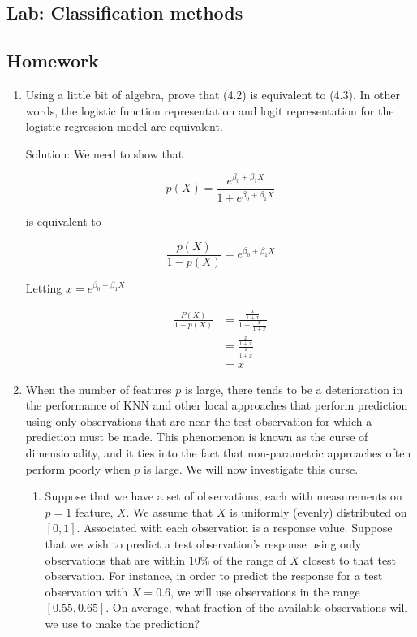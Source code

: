 \documentclass{article}
\begin{document}
\subsection*{Lab: Classification methods}

\subsection*{Homework}

\begin{enumerate}
\item Using a little bit of algebra, prove that (4.2) is equivalent to (4.3). In
 other words, the logistic function representation and logit representation
 for the logistic regression model are equivalent.

Solution: We need to show that

$$
p(X) = \frac{e^{\beta_0 + \beta_1X}}{1 + e^{\beta_0 + \beta_1X}}
$$

is equivalent to

$$
\frac{p(X)}{1-p(X)} = e^{\beta_0 + \beta_1X}
$$

Letting $x = e^{\beta_0 + \beta_1X}$

\begin{align}
\frac{P(X)}{1-p(X)} 
  &= \frac{\frac{x}{1 + x}} {1 - \frac{x}{1 + x}} \\
  &= \frac{\frac{x}{1 + x}} {\frac{1}{1 + x}} \\
  &= x
\end{align}

\item When the number of features $p$ is large, there tends to be a deterioration
 in the performance of KNN and other local approaches that perform
 prediction using only observations that are near the test observation for
 which a prediction must be made. This phenomenon is known as the
 curse of dimensionality, and it ties into the fact that non-parametric
 approaches often perform poorly when $p$ is large. We will now investigate
 this curse.

\begin{enumerate}
\item Suppose that we have a set of observations, each with measurements on
    $p = 1$ feature, $X$. We assume that $X$ is uniformly (evenly) distributed
    on $[0, 1]$. Associated with each observation is a response value. Suppose
    that we wish to predict a test observation's response using only
    observations that are within 10\% of the range of $X$ closest to that test
    observation. For instance, in order to predict the response for a test
    observation with $X = 0.6$, we will use observations in the range
    $[0.55, 0.65]$. On average, what fraction of the available observations
    will we use to make the prediction?


\end{enumerate}
\end{enumerate}
\end{document}
